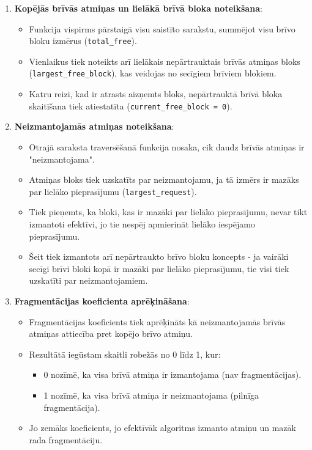 \documentclass{report}
\begin{document}
	\begin{enumerate}
		\item \textbf{Kopējās brīvās atmiņas un lielākā brīvā bloka noteikšana}:
		\begin{itemize}
			\item Funkcija vispirms pārstaigā visu saistīto sarakstu, summējot visu brīvo bloku izmērus (\texttt{total\_free}).
			\item Vienlaikus tiek noteikts arī lielākais nepārtrauktais brīvās atmiņas bloks (\texttt{largest\_free\_block}), kas veidojas no secīgiem brīviem blokiem.
			\item Katru reizi, kad ir atrasts aizņemts bloks, nepārtrauktā brīvā bloka skaitīšana tiek atiestatīta (\texttt{current\_free\_block = 0}).
		\end{itemize}
		
		\item \textbf{Neizmantojamās atmiņas noteikšana}:
		\begin{itemize}
			\item Otrajā saraksta traversēšanā funkcija nosaka, cik daudz brīvās atmiņas ir "neizmantojama".
			\item Atmiņas bloks tiek uzskatīts par neizmantojamu, ja tā izmērs ir mazāks par lielāko pieprasījumu (\texttt{largest\_request}).
			\item Tiek pieņemts, ka bloki, kas ir mazāki par lielāko pieprasījumu, nevar tikt izmantoti efektīvi, jo tie nespēj apmierināt lielāko iespējamo pieprasījumu.
			\item Šeit tiek izmantots arī nepārtraukto brīvo bloku koncepts - ja vairāki secīgi brīvi bloki kopā ir mazāki par lielāko pieprasījumu, tie visi tiek uzskatīti par neizmantojamiem.
		\end{itemize}
		
		\item \textbf{Fragmentācijas koeficienta aprēķināšana}:
		\begin{itemize}
			\item Fragmentācijas koeficients tiek aprēķināts kā neizmantojamās brīvās atmiņas attiecība pret kopējo brīvo atmiņu.
			\item Rezultātā iegūstam skaitli robežās no 0 līdz 1, kur:
			\begin{itemize}
				\item 0 nozīmē, ka visa brīvā atmiņa ir izmantojama (nav fragmentācijas).
				\item 1 nozīmē, ka visa brīvā atmiņa ir neizmantojama (pilnīga fragmentācija).
			\end{itemize}
			\item Jo zemāks koeficients, jo efektīvāk algoritms izmanto atmiņu un mazāk rada fragmentāciju.
		\end{itemize}
	\end{enumerate}
	
\end{document}
